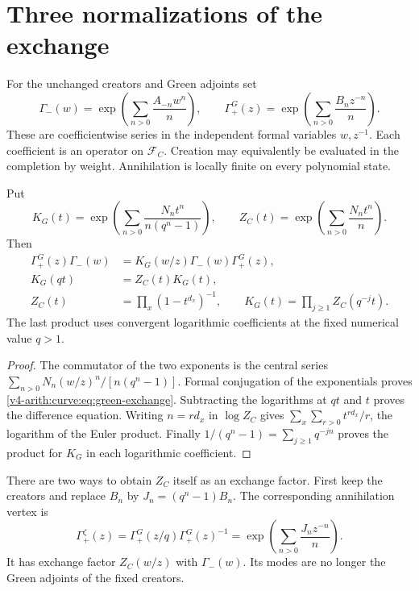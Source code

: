 \section{Three normalizations of the exchange}
\label{v4-arith:curve:sec:exchange}

For the unchanged creators and Green adjoints set
\[
 \Gamma_-(w)=\exp\left(\sum_{n>0}\frac{A_{-n}w^n}{n}\right),
 \qquad
 \Gamma_+^G(z)=\exp\left(\sum_{n>0}\frac{B_nz^{-n}}n\right).
\]
These are coefficientwise series in the independent formal variables
$w,z^{-1}$. Each coefficient is an operator on $\mathcal F_C$.
Creation may equivalently be evaluated in the completion by weight.
Annihilation is locally finite on every polynomial state.

\begin{theorem}\label{v4-arith:curve:thm:exchange}
Put
\[
 K_G(t)=\exp\left(\sum_{n>0}\frac{N_nt^n}{n(q^n-1)}\right),
 \qquad Z_C(t)=\exp\left(\sum_{n>0}\frac{N_nt^n}{n}\right).
\]
Then
\begin{align}
 \Gamma_+^G(z)\Gamma_-(w)
   &=K_G(w/z)\Gamma_-(w)\Gamma_+^G(z),
       \label{v4-arith:curve:eq:green-exchange}\\
 K_G(qt)&=Z_C(t)K_G(t),
       \label{v4-arith:curve:eq:difference}\\
 Z_C(t)&=\prod_x(1-t^{d_x})^{-1},\qquad
 K_G(t)=\prod_{j\geq1}Z_C(q^{-j}t).
       \label{v4-arith:curve:eq:products}
\end{align}
The last product uses convergent logarithmic coefficients at the
fixed numerical value $q>1$.
\end{theorem}
\begin{proof}
The commutator of the two exponents is the central series
$\sum_{n>0}N_n(w/z)^n/[n(q^n-1)]$.
Formal conjugation of the exponentials proves
\eqref{v4-arith:curve:eq:green-exchange}.
Subtracting the logarithms at $qt$ and $t$ proves the difference
equation. Writing $n=rd_x$ in $\log Z_C$ gives
$\sum_x\sum_{r>0}t^{rd_x}/r$, the logarithm of the Euler product.
Finally $1/(q^n-1)=\sum_{j\geq1}q^{-jn}$ proves the product for
$K_G$ in each logarithmic coefficient.
\end{proof}

There are two ways to obtain $Z_C$ itself as an exchange factor.
First keep the creators and replace $B_n$ by
$J_n=(q^n-1)B_n$. The corresponding annihilation vertex is
\begin{equation}\label{v4-arith:curve:eq:zeta-annihilator}
 \Gamma_+^\zeta(z)
 =\Gamma_+^G(z/q)\Gamma_+^G(z)^{-1}
 =\exp\left(\sum_{n>0}\frac{J_nz^{-n}}n\right).
\end{equation}
It has exchange factor $Z_C(w/z)$ with $\Gamma_-(w)$.
Its modes are no longer the Green adjoints of the fixed creators.

